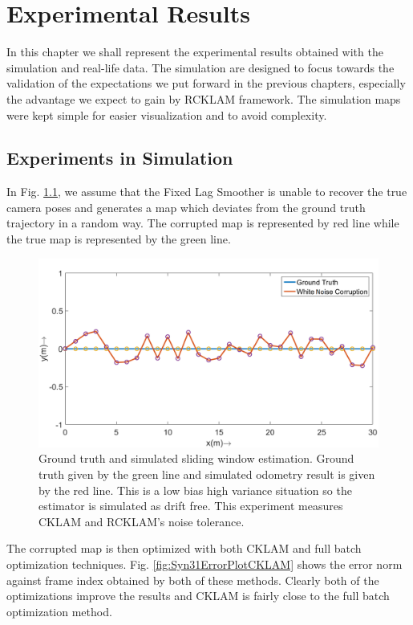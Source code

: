 \chapter{Experimental Results}
\label{chap:ExptAndResults}
  In this chapter we shall represent the experimental results obtained with the simulation and real-life data. The simulation are designed to focus towards the validation of the expectations we put forward in the previous chapters, especially the advantage we expect to gain by RCKLAM framework. The simulation maps were kept simple for easier visualization and to avoid complexity.
  
\section{Experiments in Simulation}
\label{sec:SimulationExpt}

  In Fig. \ref{fig:Syn31Map}, we assume that the Fixed Lag Smoother is unable to recover the true camera poses and generates a map which deviates from the ground truth trajectory in a random way. The corrupted map is represented by red line while the true map is represented by the  green line.
  
  
\begin{figure}
  \centering
    \includegraphics[width=1.00\textwidth]{images/Syn31_map.png}
  \caption{Ground truth and simulated sliding window estimation. Ground truth given by the green line and simulated odometry result is given by the red line. This is a low bias high variance situation so the estimator is simulated as drift free. This experiment measures CKLAM and RCKLAM's noise tolerance.}
  \label{fig:Syn31Map}
\end{figure}
  
  
  The corrupted map is then optimized with both CKLAM and full batch optimization techniques. Fig. \ref{fig:Syn31ErrorPlotCKLAM} shows the error norm against frame index obtained by both of these methods. Clearly both of the optimizations improve the results and CKLAM is fairly close to the full batch optimization method. 
  
